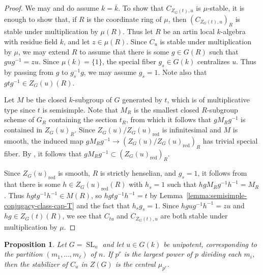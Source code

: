 \documentclass[11pt,reqno]{amsart}
\newtheorem{prop}[theorem]{Proposition}
\theoremstyle{definition}
\renewcommand{\rm}{\mathrm}
\newcommand{\sD}{{\mathscr D}}
\DeclareMathOperator{\SL}{SL}
\DeclareMathOperator{\Stab}{Stab}
\newcommand{\ov}[1]{\overline{#1}}
\begin{document}
\begin{proof}
    We may and do assume $k = \ov{k}$. To show that $C_{Z_G(t), u}$ is $\mu$-stable, it is enough to show that, if $R$ is the coordinate ring of $\mu$, then $(C_{Z_G(t), u})_R$ is stable under multiplication by $\mu(R)$. Thus let $R$ be an artin local $k$-algebra with residue field $k$, and let $z \in \mu(R)$. Since $C_u$ is stable under multiplication by $\mu$, we may extend $R$ to assume that there is some $g \in G(R)$ such that $gug^{-1} = zu$. Since $\mu(k) = \{1\}$, the special fiber $g_s \in G(k)$ centralizes $u$. Thus by passing from $g$ to $g_s^{-1}g$, we may assume $g_s = 1$. Note also that $gtg^{-1} \in Z_G(u)(R)$.

    Let $M$ be the closed $k$-subgroup of $G$ generated by $t$, which is of multiplicative type since $t$ is semisimple. Note that $M_R$ is the smallest closed $R$-subgroup scheme of $G_R$ containing the section $t_R$, from which it follows that $gM_R g^{-1}$ is contained in $Z_G(u)_R$. Since $Z_G(u)/Z_G(u)_{\rm{red}}$ is infinitesimal and $M$ is smooth, the induced map $gM_R g^{-1} \to (Z_G(u)/Z_G(u)_{\rm{red}})_R$ has trivial special fiber. By \cite[Expos\'e IX, Corollaire 3.5]{SGA3II}, it follows that $gM_Rg^{-1} \subset (Z_G(u)_{\rm{red}})_R$.
    
    Since $Z_G(u)_{\rm{red}}$ is smooth, $R$ is strictly henselian, and $g_s = 1$, it follows from \cite[Expos\'e IX, Corollaire 3.3bis]{SGA3II} that there is some $h \in Z_G(u)_{\rm{red}}(R)$ with $h_s = 1$ such that $hgM_R g^{-1}h^{-1} = M_R$. Thus $hgtg^{-1}h^{-1} \in M(R)$, so $hgtg^{-1}h^{-1} = t$ by Lemma~\ref{lemma:semisimple-conjugacy-class-cap-T} and the fact that $h_s g_s = 1$. Since $hgug^{-1}h^{-1} = zu$ and $hg \in Z_G(t)(R)$, we see that $C_{tu}$ and $C_{Z_G(t), u}$ are both stable under multiplication by $\mu$.
\end{proof}


\begin{prop}\label{prop:stability-type-a}
    Let $G = \SL_n$ and let $u \in G(k)$ be unipotent, corresponding to the partition $(m_1, \dots, m_\ell)$ of $n$. If $p^r$ is the largest power of $p$ dividing each $m_i$, then the stabilizer of $C_u$ in $Z(G)$ is the central $\mu_{p^r}$.
\end{prop}
\end{document}
